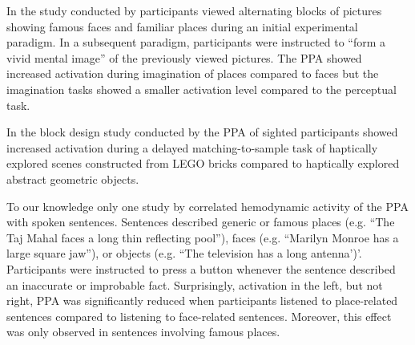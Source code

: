 \documentclass[english]{article}
\begin{document}
In the study conducted by \citep{ocraven2000mental} participants viewed
alternating blocks of pictures showing famous faces and familiar places during
an initial experimental paradigm. In a subsequent paradigm, participants were
instructed to ``form a vivid mental image'' of the previously viewed pictures.
The PPA showed increased activation during imagination of places compared to
faces but the imagination tasks showed a smaller activation level compared to
the perceptual task.

In the block design study conducted by \citep{wolbers2011modality} the PPA of
sighted participants showed increased activation during a delayed
matching-to-sample task of haptically explored scenes constructed from LEGO
bricks compared to haptically explored abstract geometric objects.





To our knowledge only one study by \citep{aziz2008modulation} correlated
hemodynamic activity of the PPA with spoken sentences. Sentences described
generic or famous places (e.g. ``The Taj Mahal faces a long thin reflecting
pool''), faces  (e.g. ``Marilyn Monroe has a large square jaw''), or objects
(e.g. ``The television has a long antenna')'. Participants were instructed to
press a button whenever the sentence described an inaccurate or improbable fact.
Surprisingly, activation in the left, but not right, PPA was significantly
reduced when participants listened to place-related sentences compared to
listening to face-related sentences. Moreover, this effect was only observed in
sentences involving famous places.
\end{document}
